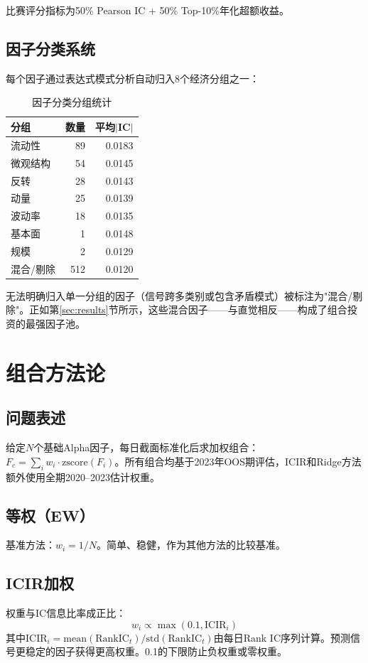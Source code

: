 \documentclass[11pt,a4paper]{ctexart}
\begin{document}
比赛评分指标为50\% Pearson IC + 50\% Top-10\%年化超额收益。

\subsection{因子分类系统}

每个因子通过表达式模式分析自动归入8个经济分组之一：

\begin{table}[H]
\centering
\caption{因子分类分组统计}
\begin{tabular}{lrr}
\toprule
\textbf{分组} & \textbf{数量} & \textbf{平均$|$IC$|$} \\
\midrule
流动性     & 89  & 0.0183 \\
微观结构   & 54  & 0.0145 \\
反转       & 28  & 0.0143 \\
动量       & 25  & 0.0139 \\
波动率     & 18  & 0.0135 \\
基本面     & 1   & 0.0148 \\
规模       & 2   & 0.0129 \\
混合/剔除  & 512 & 0.0120 \\
\bottomrule
\end{tabular}
\end{table}

无法明确归入单一分组的因子（信号跨多类别或包含矛盾模式）被标注为"混合/剔除"。正如第\ref{sec:results}节所示，这些混合因子——与直觉相反——构成了组合投资的最强因子池。

\section{组合方法论}

\subsection{问题表述}

给定$N$个基础Alpha因子，每日截面标准化后求加权组合：$F_c = \sum_i w_i \cdot \text{zscore}(F_i)$。所有组合均基于2023年OOS期评估，ICIR和Ridge方法额外使用全期2020--2023估计权重。

\subsection{等权（EW）}
基准方法：$w_i = 1/N$。简单、稳健，作为其他方法的比较基准。

\subsection{ICIR加权}
权重与IC信息比率成正比：
\begin{equation}
w_i \propto \max(0.1, \text{ICIR}_i)
\end{equation}
其中$\text{ICIR}_i = \text{mean}(\text{RankIC}_t) / \text{std}(\text{RankIC}_t)$由每日Rank IC序列计算。预测信号更稳定的因子获得更高权重。0.1的下限防止负权重或零权重。
\end{document}
